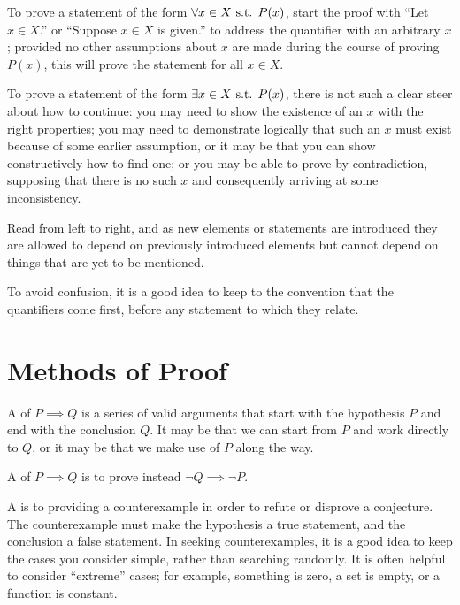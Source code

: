 To prove a statement of the form $\forall x \in X \text{ s.t. } P(x)$, start the proof with ``Let $x \in X$.'' or ``Suppose $x \in X$ is given.'' to address the quantifier with an arbitrary $x$; provided no other assumptions about $x$ are made during the course of proving $P(x)$, this will prove the statement for all $x \in X$. 

To prove a statement of the form $\exists x \in X \text{ s.t. } P(x)$, there is not such a clear steer about how to continue: you may need to show the existence of an $x$ with the right properties; you may need to demonstrate logically that such an $x$ must exist because of some earlier assumption, or it may be that you can show constructively how to find one; or you may be able to prove by contradiction, supposing that there is no such $x$ and consequently arriving at some inconsistency.

\begin{remark}
Read from left to right, and as new elements or statements are introduced they are allowed to depend on previously introduced elements but cannot depend on things that are yet to be mentioned.
\end{remark}

\begin{remark}
To avoid confusion, it is a good idea to keep to the convention that the quantifiers come first, before any statement to which they relate.
\end{remark}
\pagebreak

\section{Methods of Proof}
A  of $P \implies Q$ is a series of valid arguments that start with the hypothesis $P$ and end with the conclusion $Q$. It may be that we can start from $P$ and work directly to $Q$, or it may be that we make use of $P$ along the way.

A  of $P \implies Q$ is to prove instead $\lnot Q \implies \lnot P$.

A  is to providing a counterexample in order to refute or disprove a conjecture. The counterexample must make the hypothesis a true statement, and the conclusion a false statement. In seeking counterexamples, it is a good idea to keep the cases you consider simple, rather than searching randomly. It is often helpful to consider ``extreme'' cases; for example, something is zero, a set is empty, or a function is constant.

